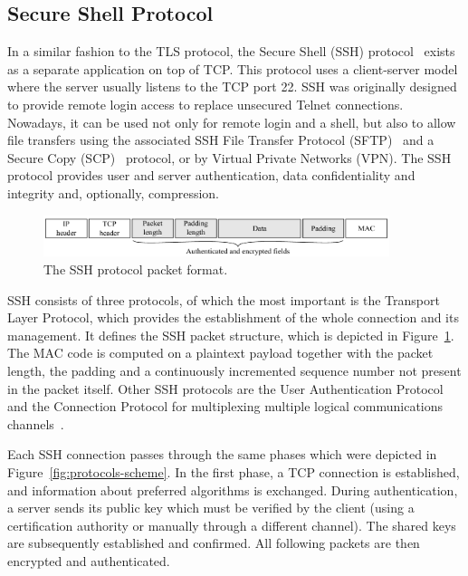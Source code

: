 
\subsection{Secure Shell Protocol}
In a similar fashion to the TLS protocol, the Secure Shell (SSH) protocol~\cite{rfc4253} exists as a separate application on top of TCP. This protocol uses a client-server model where the server usually listens to the TCP port 22. SSH was originally designed to provide remote login access to replace unsecured Telnet connections. Nowadays, it can be used not only for remote login and a shell, but also to allow file transfers using the associated SSH File Transfer Protocol (SFTP)~\cite{sftp-draft} and a Secure Copy (SCP)~\cite{scp-description} protocol, or by Virtual Private Networks (VPN). The SSH protocol provides user and server authentication, data confidentiality and integrity and, optionally, compression.

\begin{figure}[!ht]
    \begin{center}
        \includegraphics[width=0.9\textwidth]{figures/paper-encrypted/ssh_packet}
        \caption{The SSH protocol packet format.} 
        \label{fig:ssh-packet}
    \end{center}
\end{figure}

SSH consists of three protocols, of which the most important is the Transport Layer Protocol, which provides the establishment of the whole connection and its management. It defines the SSH packet structure, which is depicted in Figure~\ref{fig:ssh-packet}. The MAC code is computed on a plaintext payload together with the packet length, the padding and a continuously incremented sequence number not present in the packet itself. Other SSH protocols are the User Authentication Protocol and the Connection Protocol for multiplexing multiple logical communications channels~\cite{ssh-basics}.

Each SSH connection passes through the same phases which were depicted in Figure~\ref{fig:protocols-scheme}. In the first phase, a TCP connection is established, and information about preferred algorithms is exchanged. During authentication, a server sends its public key which must be verified by the client (using a certification authority or manually through a different channel). The shared keys are subsequently established and confirmed. All following packets are then encrypted and authenticated.



